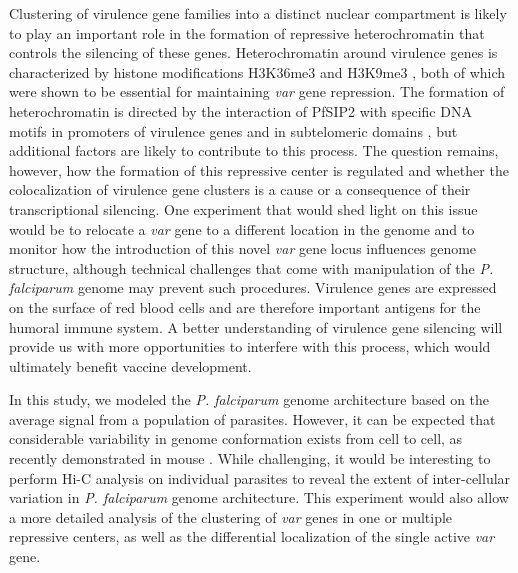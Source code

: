 Clustering of virulence gene families into a distinct nuclear compartment is likely to play an important role in the formation of repressive heterochromatin that controls the silencing of these genes. Heterochromatin around virulence genes is characterized by histone modifications H3K36me3 \citep{jiang:pfsetvs} and H3K9me3 \citep{duraisingh:heterochromatin, lopez-rubio:genome-wide}, both of which were shown to be essential for maintaining {\em var} gene repression. The formation of heterochromatin is directed by the interaction of PfSIP2 with specific DNA motifs in promoters of virulence genes and in subtelomeric domains \citep{flueck:major}, but additional factors are likely to contribute to this process. The question remains, however, how the formation of this repressive center is regulated and whether the colocalization of virulence gene clusters is a cause or a consequence of their transcriptional silencing. One experiment that would shed light on this issue would be to relocate a {\em var} gene to a different location in the genome and to monitor how the introduction of this novel {\em var} gene locus influences genome structure, although technical challenges that come with manipulation of the {\em P. falciparum} genome may prevent such procedures. Virulence genes are expressed on the surface of red blood cells and are therefore important antigens for the humoral immune system. A better understanding of virulence gene silencing will provide us with more opportunities to interfere with this process, which would ultimately benefit vaccine development.

In this study, we modeled the {\em P. falciparum} genome architecture based on the average signal from a population of parasites. However, it can be expected that considerable variability in genome conformation exists from cell to cell, as recently demonstrated in mouse \citep{nagano:single-cell}. While challenging, it would be interesting to perform Hi-C analysis on individual parasites to reveal the extent of inter-cellular variation in {\em P. falciparum} genome architecture. This experiment would also allow a more detailed analysis of the clustering of {\em var} genes in one or multiple repressive centers, as well as the differential localization of the single active {\em var} gene.


